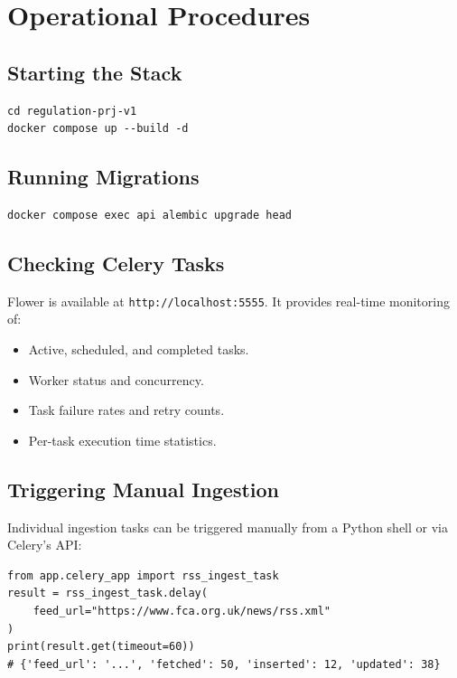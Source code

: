 \documentclass[12pt,a4paper]{article}
\begin{document}
\section{Operational Procedures}

\subsection{Starting the Stack}

\begin{lstlisting}[style=shellstyle, caption={Start all services}]
cd regulation-prj-v1
docker compose up --build -d
\end{lstlisting}

\subsection{Running Migrations}

\begin{lstlisting}[style=shellstyle, caption={Apply Alembic migrations}]
docker compose exec api alembic upgrade head
\end{lstlisting}

\subsection{Checking Celery Tasks}

Flower is available at \texttt{http://localhost:5555}. It provides real-time monitoring of:
\begin{itemize}[noitemsep]
  \item Active, scheduled, and completed tasks.
  \item Worker status and concurrency.
  \item Task failure rates and retry counts.
  \item Per-task execution time statistics.
\end{itemize}

\subsection{Triggering Manual Ingestion}

Individual ingestion tasks can be triggered manually from a Python shell or via Celery's API:

\begin{lstlisting}[caption={Trigger a manual RSS poll}]
from app.celery_app import rss_ingest_task
result = rss_ingest_task.delay(
    feed_url="https://www.fca.org.uk/news/rss.xml"
)
print(result.get(timeout=60))
# {'feed_url': '...', 'fetched': 50, 'inserted': 12, 'updated': 38}
\end{lstlisting}
\end{document}
